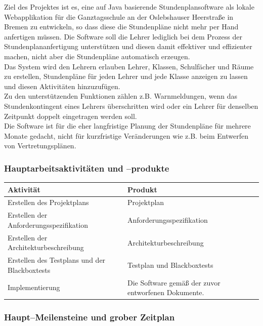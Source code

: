 \documentclass[fontsize=12pt,paper=a4,twoside]{scrartcl}
\begin{document}
Ziel des Projektes ist es, eine auf Java basierende Stundenplansoftware als lokale Webapplikation für die Ganztagsschule an der Oslebshauser Heerstraße in Bremen zu entwickeln, so dass diese die Stundenpläne nicht mehr per Hand anfertigen müssen. Die Software soll die Lehrer lediglich bei dem Prozess der Stundenplananfertigung unterstützen und diesen damit effektiver und effizienter machen, nicht aber die Stundenpläne automatisch erzeugen. \\
Das System wird den Lehrern erlauben Lehrer, Klassen, Schulfächer und Räume zu erstellen, Stundenpläne für jeden Lehrer und jede Klasse anzeigen zu lassen und diesen Aktivitäten hinzuzufügen. \\
Zu den unterstützenden Funktionen zählen z.B. Warnmeldungen, wenn das Stundenkontingent eines Lehrers überschritten wird oder ein Lehrer für denselben Zeitpunkt doppelt eingetragen werden soll. \\
Die Software ist für die eher langfristige Planung der Stundenpläne für mehrere Monate gedacht, nicht für kurzfristige Veränderungen wie z.B. beim Entwerfen von Vertretungsplänen.

\subsubsection{Hauptarbeitsaktivitäten und --produkte}
\begin{tabularx}{\textwidth}{|X|X|}
\hline \textbf{Aktivität} & \textbf{Produkt}  \\ 
\hline Erstellen des Projektplans & Projektplan \\ 
\hline Erstellen der Anforderungsspezifikation & Anforderungsspezifikation \\
\hline Erstellen der Architekturbeschreibung & Architekturbeschreibung \\
\hline Erstellen des Testplans und der Blackboxtests & Testplan und Blackboxtests \\
\hline Implementierung & Die Software gemäß der zuvor entworfenen Dokumente. \\
\hline 
\end{tabularx} 

\clearpage
\subsubsection{Haupt--Meilensteine und grober Zeitplan}
\end{document}
